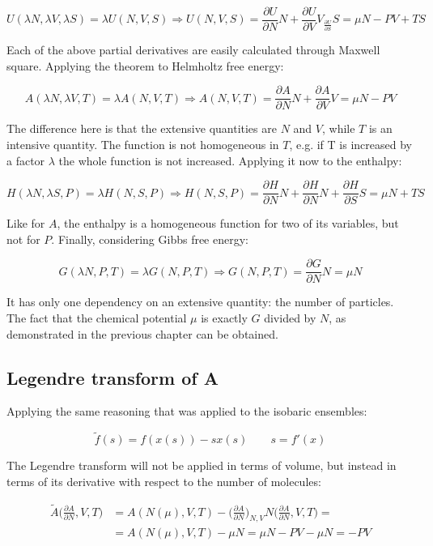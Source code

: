 	$$U(\lambda N, \lambda V, \lambda S) = \lambda U(N, V, S)\Rightarrow U(N, V, S) = \frac{\partial U}{\partial N}N + \frac{\partial U}{\partial V}V_\frac{\partial U}{\partial S}S = \mu N - PV + TS$$

	Each of the above partial derivatives are easily calculated through Maxwell square.
	Applying the theorem to Helmholtz free energy:

	$$A(\lambda N, \lambda V, T) = \lambda A(N, V, T) \Rightarrow A(N, V, T) = \frac{\partial A}{\partial N}N + \frac{\partial A}{\partial V}V = \mu N - PV$$

	The difference here is that the extensive quantities are $N$ and $V$, while $T$ is an intensive quantity.
	The function is not homogeneous in $T$, e.g. if T is increased by a factor $\lambda$ the whole function is not increased.
	Applying it now to the enthalpy:

	$$H(\lambda N, \lambda S, P) = \lambda H(N, S, P)\Rightarrow H(N, S, P) = \frac{\partial H}{\partial N}N+\frac{\partial H}{\partial N}N+\frac{\partial H}{\partial S}S = \mu N+TS$$

	Like for $A$, the enthalpy is a homogeneous function for two of its variables, but not for $P$.
	Finally, considering Gibbs free energy:

	$$G(\lambda N, P, T) = \lambda G(N, P, T)\Rightarrow G(N, P, T) = \frac{\partial G}{\partial N}N= \mu N$$

	It has only one dependency on an extensive quantity: the number of particles.
	The fact that the chemical potential $\mu$ is exactly $G$ divided by $N$, as demonstrated in the previous chapter can be obtained.

	\subsection{Legendre transform of A}
	Applying the same reasoning that was applied to the isobaric ensembles:

	$$\tilde{f}(s) = f(x(s))-sx(s)\qquad s = f'(x)$$

	The Legendre transform will not be applied in terms of volume, but instead in terms of its derivative with respect to the number of molecules:

	\begin{align*}
		\tilde{A}\biggl(\frac{\partial A}{\partial N}, V, T\biggr) &= A(N(\mu), V, T)-\biggl(\frac{\partial A}{\partial N}\biggr)_{N, V}N\biggl(\frac{\partial A}{\partial N}, V, T\biggr) = \\
																															 &=A(N(\mu), V, T) - \mu N = \mu N - PV - \mu N = -PV
	\end{align*}

